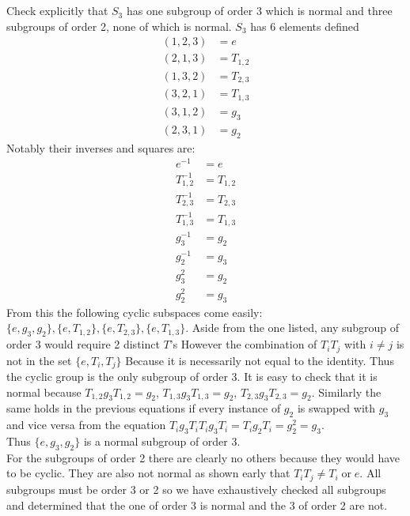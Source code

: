 \documentclass{article}
\begin{document}
    \section{}
    Check explicitly that $S_3$ has one subgroup of order 3 which is normal and three subgroups of order 2,
    none of which is normal.
    $S_3$ has 6 elements defined
    \begin{align*}
        (1,2,3) &= e\\
        (2,1,3) &= T_{1,2}\\
        (1,3,2) &= T_{2,3}\\
        (3,2,1) &= T_{1,3}\\
        (3,1,2) &= g_3\\
        (2,3,1) &= g_2
    \end{align*}
    Notably their inverses and squares are:
    \begin{align*}
        e^{-1} &= e\\
        T_{1,2}^{-1} &= T_{1,2}\\
        T_{2,3}^{-1} &= T_{2,3}\\
        T_{1,3}^{-1} &= T_{1,3}\\
        g_3^{-1} &= g_2\\
        g_2^{-1} &= g_3\\
        g_3^2 &= g_2\\
        g_2^2 &= g_3
    \end{align*}
    From this the following cyclic subspaces come easily: 
    $\{e,g_3,g_2\},\{e,T_{1,2}\},\{e,T_{2,3}\},\{e,T_{1,3}\}$.
    Aside from the one listed, any subgroup of order 3 would require 2 distinct  $T$'s However 
    the combination of  $T_iT_j$ with $i\ne j$ is not in the set $\{e,T_i,T_j\}$ Because it is necessarily not equal to the identity.
    Thus the cyclic group is the only subgroup of order 3.
    It is easy to check that it is normal because $T_{1,2}g_3T_{1,2} = g_2$, $T_{1,3}g_3T_{1,3} = g_2$, $T_{2,3}g_3T_{2,3} = g_2$.
    Similarly the same holds in the previous equations if every instance of $g_2$ is swapped with $g_3$ and vice versa from the equation
    $T_ig_3T_iT_ig_3T_i = T_ig_2T_i = g_2^2 = g_3$.\\
Thus $\{e,g_3,g_2\}$ is a normal subgroup of order 3.
    \\
    For the subgroups of order 2 there are clearly no others because they would have to be cyclic.
    They are also not normal as shown early that $T_iT_j \ne T_i \; \text{or} \; e$.
    All subgroups must be order 3 or 2 so we have exhaustively checked all subgroups and determined that the one of order 3 is normal
    and the 3 of order 2 are not.
\end{document}
